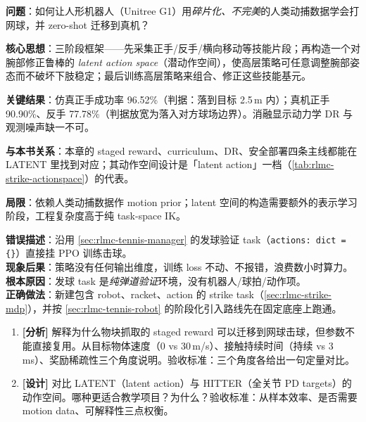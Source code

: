 \begin{paper}\label{paper:rlmc-strike-latent}
\textbf{问题}：如何让人形机器人（Unitree G1）用\emph{碎片化、不完美}的人类动捕数据学会打网球，并 zero-shot 迁移到真机？

\textbf{核心思想}：三阶段框架——先采集正手/反手/横向移动等技能片段；再构造一个对腕部修正鲁棒的 \emph{latent action space}（潜动作空间），使高层策略可任意调整腕部姿态而不破坏下肢稳定；最后训练高层策略来组合、修正这些技能基元。

\textbf{关键结果}：仿真正手成功率 96.52\%（判据：落到目标 2.5\,m 内）；真机正手 90.90\%、反手 77.78\%（判据放宽为落入对方球场边界）。消融显示动力学 DR 与观测噪声缺一不可。

\textbf{与本书关系}：本章的 staged reward、curriculum、DR、安全部署四条主线都能在 LATENT 里找到对应；其动作空间设计是「latent action」一档（\cref{tab:rlmc-strike-actionspace}）的代表。

\textbf{局限}：依赖人类动捕数据作 motion prior；latent 空间的构造需要额外的表示学习阶段，工程复杂度高于纯 task-space IK。
\end{paper}

\begin{pitfall}
\textbf{错误描述}：沿用 \cref{sec:rlmc-tennis-manager} 的发球验证 task（\verb|actions: dict = {}|）直接挂 PPO 训练击球。\\
\textbf{现象后果}：策略没有任何输出维度，训练 loss 不动、不报错，浪费数小时算力。\\
\textbf{根本原因}：发球 task 是\emph{纯弹道验证}环境，没有机器人/球拍/动作项。\\
\textbf{正确做法}：新建包含 robot、racket、action 的 strike task（\cref{sec:rlmc-strike-mdp}），并按 \cref{sec:rlmc-tennis-robot} 的阶段化引入路线先在固定底座上跑通。
\end{pitfall}

\begin{practice}[本节动手任务]
\begin{enumerate}
  \item \textbf{[分析]} 解释为什么物块抓取的 staged reward 可以迁移到网球击球，但参数不能直接复用。从目标物体速度（0 vs 30\,m/s）、接触持续时间（持续 vs 3\,ms）、奖励稀疏性三个角度说明。验收标准：三个角度各给出一句定量对比。
  \item \textbf{[设计]} 对比 LATENT（latent action）与 HITTER（全关节 PD targets）的动作空间。哪种更适合教学项目？为什么？验收标准：从样本效率、是否需要 motion data、可解释性三点权衡。
\end{enumerate}
\end{practice}

